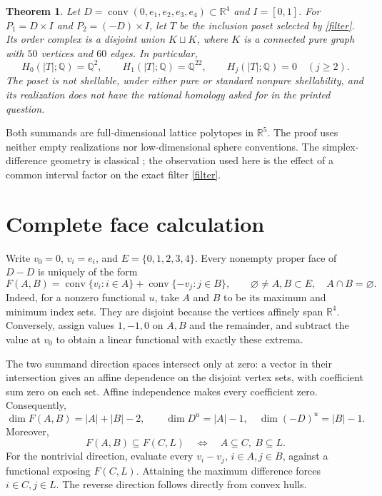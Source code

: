 \documentclass[11pt]{article}
\newtheorem{theorem}{Theorem}
\newcommand{\R}{\mathbb R}
\newcommand{\Q}{\mathbb Q}
\newcommand{\conv}{\operatorname{conv}}
\newcommand{\dimn}{\operatorname{dim}}
\begin{document}
\begin{theorem}\label{main}
Let $D=\conv(0,e_1,e_2,e_3,e_4)\subset\R^4$ and $I=[0,1]$.
For $P_1=D\times I$ and $P_2=(-D)\times I$, let $T$ be the
inclusion poset selected by \eqref{filter}. Its order complex is a
disjoint union $K\sqcup K$, where $K$ is a connected pure graph with
$50$ vertices and $60$ edges. In particular,
\[
 H_0(|T|;\Q)=\Q^2,\qquad H_1(|T|;\Q)=\Q^{22},\qquad
 H_j(|T|;\Q)=0\quad(j\ge2).
\]
The poset is not shellable, under either pure or standard nonpure
shellability, and its realization does not have the rational homology
asked for in the printed question.
\end{theorem}

Both summands are full-dimensional lattice polytopes in $\R^5$.
The proof uses neither empty realizations nor low-dimensional sphere
conventions. The simplex-difference geometry is classical
\cite{FW,ST}; the observation used here is the effect of a common
interval factor on the exact filter \eqref{filter}.

\section{Complete face calculation}
Write $v_0=0$, $v_i=e_i$, and $E=\{0,1,2,3,4\}$.
Every nonempty proper face of $D-D$ is uniquely of the form
\[
 F(A,B)=\conv\{v_i:i\in A\}+\conv\{-v_j:j\in B\},
 \qquad \varnothing\ne A,B\subset E,\quad A\cap B=\varnothing .
\]
Indeed, for a nonzero functional $u$, take $A$ and $B$ to be its
maximum and minimum index sets. They are disjoint because the vertices
affinely span $\R^4$. Conversely, assign values $1,-1,0$ on $A,B$ and
the remainder, and subtract the value at $v_0$ to obtain a linear
functional with exactly these extrema.

The two summand direction spaces intersect only at zero: a vector
in their intersection gives an affine dependence on the disjoint
vertex sets, with coefficient sum zero on each set. Affine
independence makes every coefficient zero. Consequently,
\begin{equation}\label{dim}
 \dimn F(A,B)=|A|+|B|-2,\qquad
 \dimn D^u=|A|-1,\quad \dimn(-D)^u=|B|-1 .
\end{equation}
Moreover,
\begin{equation}\label{order}
 F(A,B)\subseteq F(C,L)\quad\Longleftrightarrow\quad
 A\subseteq C,\ B\subseteq L .
\end{equation}
For the nontrivial direction, evaluate every $v_i-v_j$,
$i\in A,j\in B$, against a functional exposing $F(C,L)$.
Attaining the maximum difference forces $i\in C,j\in L$.
The reverse direction follows directly from convex hulls.
\end{document}
